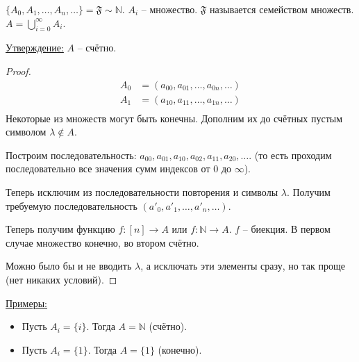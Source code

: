 \documentclass[a4paper, 12pt]{article}
\newcommand{\statement}{\underline{Утверждение:} }
\newcommand{\N}{\mathbb{N}}
\begin{document}
\begin{enumerate}
           $\{A_0, A_1, \ldots, A_n, \ldots\} = \mathfrak{F} \sim \N$. $A_i$ -- множество.
           $\mathfrak{F}$ называется семейством множеств. 
           $A = \bigcup\limits_{i=0}^{\infty} A_i$.

           \statement $A$ -- счётно.
           \begin{proof}
               \begin{align*}
                   A_0 &= (a_{00}, a_{01}, \ldots, a_{0n}, \ldots) \\
                   A_1 &= (a_{10}, a_{11}, \ldots, a_{1n}, \ldots) \\
               \end{align*}
               Некоторые из множеств могут быть конечны. Дополним их до счётных
               пустым символом $\lambda \notin A$.

               Построим последовательность: $a_{00}, a_{01}, a_{10}, a_{02},
               a_{11}, a_{20}, \ldots$. (то есть проходим последовательно все значения
               сумм индексов от $0$ до $\infty$).

               Теперь исключим из последовательности повторения и символы $\lambda$.
               Получим требуемую последовательность $(a'_0, a'_1, \ldots, a'_n, \ldots)$.

               Теперь получим функцию $f: [n] \to A$ или $f: \N \to A$. $f$ -- биекция.
               В первом случае множество конечно, во втором счётно.

               Можно было бы и не вводить $\lambda$, а исключать эти элементы сразу,
               но так проще (нет никаких условий).
           \end{proof}

           \underline{Примеры:} 
           \begin{itemize}
                \item Пусть $A_i = \{i\}$. Тогда $A = \N$ (счётно).
                \item Пусть $A_i = \{1\}$. Тогда $A = \{1\}$ (конечно).
           \end{itemize}


\end{enumerate}
\end{document}
